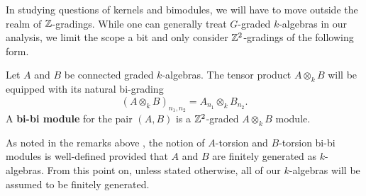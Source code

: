 In studying questions of kernels and bimodules, we will have to move outside the realm of \(\mathbb{Z}\)-gradings. While one can generally treat \(G\)-graded \(k\)-algebras in our analysis, we limit the scope a bit and only consider \(\mathbb{Z}^2\)-gradings of the following form.

\begin{definition}
  Let \(A\) and \(B\) be connected graded \(k\)-algebras. The tensor product \(A \otimes_k B\) will be equipped with its natural bi-grading 
  \begin{displaymath}
    (A \otimes_k B)_{n_1,n_2} = A_{n_1} \otimes_k B_{n_2}. 
  \end{displaymath}
  A \textbf{bi-bi module} for the pair \((A,B)\) is a \(\mathbb{Z}^2\)-graded \(A \otimes_k B\) module. 
\end{definition}

\begin{remark}
  As noted in the remarks above \textcite[Lemma 4.1]{VdB}, the notion of \(A\)-torsion and \(B\)-torsion bi-bi modules is well-defined provided that \(A\) and \(B\) are finitely generated as \(k\)-algebras.
  From this point on, unless stated otherwise, all of our \(k\)-algebras will be assumed to be finitely generated.
\end{remark}



